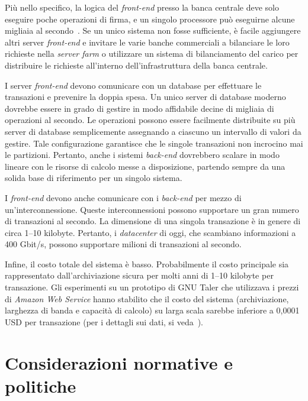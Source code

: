 \documentclass{article}
\begin{document}
Più nello specifico, la logica del \textit{front-end} presso la banca
centrale deve solo eseguire poche operazioni di firma, e un singolo
processore può eseguirne alcune migliaia al secondo~\cite[vedi][]{Bernstein2020}.
Se un unico sistema non fosse sufficiente, è facile aggiungere altri
server \textit{front-end} e invitare le varie banche commerciali a
bilanciare le loro richieste nella \textit{server farm} o
utilizzare un sistema di bilanciamento del carico per distribuire le
richieste all'interno dell'infrastruttura della banca centrale.

I server \textit{front-end} devono comunicare con un database per
effettuare le transazioni e prevenire la doppia spesa. Un unico server
di database moderno dovrebbe essere in grado di gestire in modo
affidabile decine di migliaia di operazioni al secondo. Le operazioni
possono essere facilmente distribuite su più server di database
semplicemente assegnando a ciascuno un intervallo di valori da
gestire. Tale configurazione garantisce che le singole transazioni non
incrocino mai le partizioni. Pertanto, anche i sistemi \textit{back-end}
dovrebbero scalare in modo lineare con le risorse di calcolo messe a
disposizione, partendo sempre da una solida base di riferimento per un
singolo sistema.

I \textit{front-end} devono anche comunicare con i \textit{back-end} per
mezzo di un'interconnessione. Queste interconnessioni possono
supportare un gran numero di transazioni al secondo. La dimensione di
una singola transazione è in genere di circa 1–10 kilobyte. Pertanto,
i \textit{datacenter} di oggi, che scambiano informazioni a 400 Gbit/s,
possono supportare milioni di transazioni al secondo.

Infine, il costo totale del sistema è basso. Probabilmente il costo
principale sia rappresentato dall'archiviazione sicura per
molti anni di 1–10 kilobyte per transazione. Gli esperimenti su un
prototipo di GNU Taler che utilizzava i prezzi di \textit{Amazon Web Service}
hanno stabilito che il costo del sistema (archiviazione, larghezza di
banda e capacità di calcolo) su larga scala sarebbe inferiore a
0,0001 USD per transazione (per i dettagli sui dati, si veda~\citet{Dold}).


\section{Considerazioni normative e politiche}
    \label{5.-considerazioni-normative-e-politiche}
\end{document}
